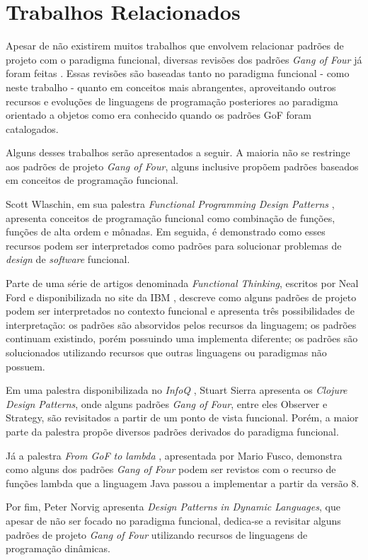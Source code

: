 \chapter{Trabalhos Relacionados}

Apesar de não existirem muitos trabalhos que envolvem
relacionar padrões de projeto com o paradigma funcional, 
diversas revisões dos padrões \textit{Gang of Four} 
já foram feitas 
\cite{nealford,peternorvig,scottwlaschin,stuartsierra,mariofusco}.
Essas revisões são baseadas tanto no paradigma 
funcional - como neste trabalho - quanto em  
conceitos mais abrangentes, aproveitando 
outros recursos e evoluções de linguagens de 
programação posteriores ao paradigma orientado a 
objetos como era conhecido quando os padrões GoF 
foram catalogados.

Alguns desses trabalhos serão apresentados a seguir.
A maioria não se restringe aos padrões de 
projeto \textit{Gang of Four}, alguns inclusive propõem 
padrões baseados em conceitos de programação funcional.

Scott Wlaschin, em sua palestra \textit{Functional Programming 
Design Patterns} \cite{scottwlaschin}, apresenta conceitos 
de programação funcional como combinação de funções, 
funções de alta ordem e mônadas. Em seguida, é 
demonstrado como esses recursos podem ser 
interpretados como padrões para solucionar problemas 
de \textit{design} de \textit{software} funcional.

Parte de uma série de artigos denominada \textit{Functional 
Thinking}, escritos por Neal Ford e disponibilizada 
no site da IBM \cite{nealford}, descreve como alguns padrões 
de projeto podem ser interpretados no contexto funcional e 
apresenta três possibilidades de interpretação: 
os padrões são absorvidos pelos recursos da 
linguagem; os padrões continuam existindo, porém possuindo 
uma implementa diferente; os padrões são solucionados 
utilizando recursos que outras linguagens ou 
paradigmas não possuem.

Em uma palestra disponibilizada no \textit{InfoQ} 
\cite{stuartsierra}, Stuart Sierra 
apresenta os \textit{Clojure Design Patterns}, onde alguns 
padrões \textit{Gang of Four}, entre eles Observer e 
Strategy, são revisitados a partir de um ponto de 
vista funcional. Porém, a maior parte da palestra propõe 
diversos padrões derivados do paradigma funcional.

Já a palestra \textit{From GoF to lambda} \cite{mariofusco}, 
apresentada por Mario Fusco, demonstra como alguns 
dos padrões \textit{Gang of Four} podem ser revistos 
com o recurso de funções lambda que a linguagem Java 
passou a implementar a partir da versão 8.

Por fim, Peter Norvig apresenta \textit{Design Patterns in 
Dynamic Languages}\cite{peternorvig}, que apesar de não ser 
focado no paradigma funcional, dedica-se a revisitar alguns 
padrões de projeto \textit{Gang of Four} utilizando recursos 
de linguagens de programação dinâmicas. 
